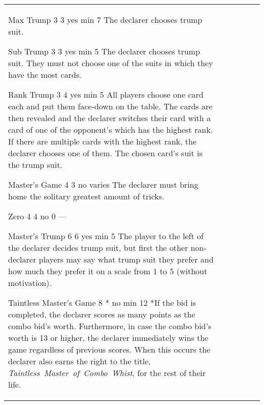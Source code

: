 \begin{center}
\begin{tabularx}{\textwidth}{
				l
				S[table-number-alignment=center, table-format=1.0]
				S[table-number-alignment=center, table-format=1.0]
				cc|X
			}
			\standardBidItem%
			{Max Trump}
			{3}
			{3}
			{yes}
			{min 7}
			{%
				The declarer chooses trump suit.
			}

			\standardBidItem%
			{Sub Trump}
			{3}
			{3}
			{yes}
			{min 5}
			{%
				The declarer chooses trump suit. They must not choose one of the suits in which they have the most cards.
			}

			\standardBidItem%
			{Rank Trump}
			{3}
			{4}
			{yes}
			{min 5}
			{%
				All players choose one card each and put them face-down on the table. The cards are then revealed and the declarer switches their card with a card of one of the opponent's which has the highest rank. If there are multiple cards with the highest rank, the declarer chooses one of them. The chosen card's suit is the trump suit.
			}

			\standardBidItem%
			{Master's Game}
			{4}
			{3}
			{no}
			{varies}
			{%
				The declarer must bring home the solitary greatest amount of tricks.
			}

			\standardBidItem%
			{Zero}
			{4}
			{4}
			{no}
			{0}
			{%
				---
			}

			\standardBidItem%
			{Master's Trump}
			{6}
			{6}
			{yes}
			{min 5}
			{%
				The player to the left of the declarer decides trump suit, but first the other non-declarer players may say what trump suit they prefer and how much they prefer it on a scale from 1 to 5 (without motivation).
			}

			\standardBidItem%
			{Taintless Master's Game}
			{8}
			{*}
			{no}
			{min 12}
			{%
				*If the bid is completed, the declarer scores as many points as the combo bid's worth. Furthermore, in case the combo bid's worth is 13 or higher, the declarer immediately wins the game regardless of previous scores. When this occurs the declarer also earns the right to the title, \emph{Taintless~Master~of~Combo~Whist}, for the rest of their life.
			}
		\end{tabularx}
	\end{center}
